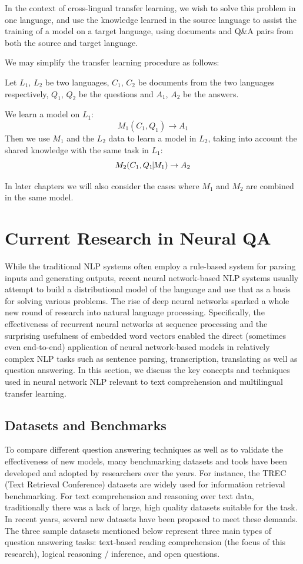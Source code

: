 \documentclass[]{article}
\begin{document}
In the context of cross-lingual transfer learning, we wish to solve this problem in one language, and use the knowledge learned in the source language to assist the training of a model on a target language, using documents and Q\&A pairs from both the source and target language.

We may simplify the transfer learning procedure as follows:

Let $L_1$, $L_2$ be two languages, $C_1$, $C_2$ be documents from the two languages respectively, $Q_1$, $Q_2$ be the questions and $A_1$, $A_2$ be the answers.

We learn a model on $L_1$:
\[  M_1(C_1, Q_1) \to A_1\]
Then we use $M_1$ and the $L_2$ data to learn a model in $L_2$, taking into account the shared knowledge with the same task in $L_1$:
\[  M_2(C_1, Q_1 \vline M_1) \to A_2\]

In later chapters we will also consider the cases where $M_1$ and $M_2$ are combined in the same model.


\section{Current Research in Neural QA}

While the traditional NLP systems often employ a rule-based system for parsing inputs and generating outputs, recent neural network-based NLP systems usually attempt to build a distributional model of the language and use that as a basis for solving various problems. The rise of deep neural networks sparked a whole new round of research into natural language processing. Specifically, the effectiveness of recurrent neural networks at sequence processing and the surprising usefulness of embedded word vectors enabled the direct (sometimes even end-to-end) application of neural network-based models in relatively complex NLP tasks such as sentence parsing, transcription, translating as well as question answering. In this section, we discuss the key concepts and techniques used in neural network NLP relevant to text comprehension and multilingual transfer learning.

\subsection{Datasets and Benchmarks}

To compare different question answering techniques as well as to validate the effectiveness of new models, many benchmarking datasets and tools have been developed and adopted by researchers over the years. For instance, the TREC (Text Retrieval Conference) datasets are widely used for information retrieval benchmarking. For text comprehension and reasoning over text data, traditionally there was a lack of large, high quality datasets suitable for the task. In recent years, several new datasets have been proposed to meet these demands. The three sample datasets mentioned below represent three main types of question answering tasks: text-based reading comprehension (the focus of this research), logical reasoning / inference, and open questions.
\end{document}

